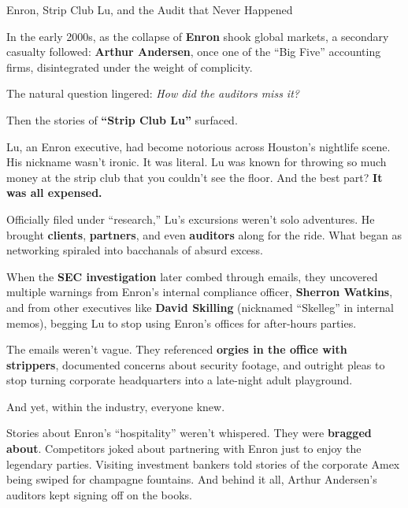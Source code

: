 \begin{HistoricalSidebar}{Enron, Strip Club Lu, and the Audit that Never Happened}

  In the early 2000s, as the collapse of \textbf{Enron} shook global markets, a secondary casualty followed: 
  \textbf{Arthur Andersen}, once one of the “Big Five” accounting firms, disintegrated under the weight of 
  complicity.  

  \medskip
  
  The natural question lingered: \textit{How did the auditors miss it?}  

  \medskip
  
  Then the stories of \textbf{“Strip Club Lu”} surfaced.  
  
  \medskip
  
  Lu, an Enron executive, had become notorious across Houston’s nightlife scene. His nickname wasn’t ironic. 
  It was literal. Lu was known for throwing so much money at the strip club that you couldn’t see the floor. 
  And the best part?  \textbf{It was all expensed.}  

  \medskip
  
  Officially filed under ``research,'' Lu’s excursions weren’t solo adventures. He brought \textbf{clients}, 
  \textbf{partners}, and even \textbf{auditors} along for the ride. What began as networking spiraled into 
  bacchanals of absurd excess.  
  
  \medskip
  
  When the \textbf{SEC investigation} later combed through emails, they uncovered 
  multiple warnings from Enron’s internal compliance officer, \textbf{Sherron Watkins}, and from other 
  executives like \textbf{David Skilling} (nicknamed ``Skelleg'' in internal memos), begging Lu to stop 
  using Enron’s offices for after-hours parties.  

  \medskip
  
  The emails weren’t vague. They referenced \textbf{orgies in the office with strippers}, documented 
  concerns about security footage, and outright pleas to stop turning corporate headquarters into a 
  late-night adult playground.  
  
  \medskip
  
  And yet, within the industry, everyone knew.  

  \medskip
  
  Stories about Enron’s “hospitality” weren’t whispered. They were \textbf{bragged about}. Competitors joked 
  about partnering with Enron just to enjoy the legendary parties. Visiting investment bankers told stories 
  of the corporate Amex being swiped for champagne fountains. And behind it all, Arthur Andersen’s auditors 
  kept signing off on the books.  
  

\end{HistoricalSidebar}
